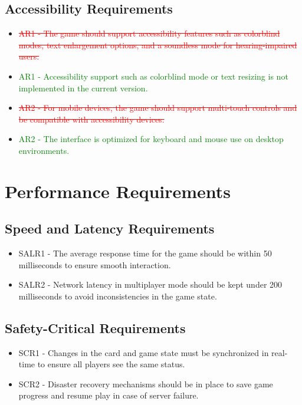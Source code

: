 \documentclass[12pt]{article}
\newcommand{\removed}[1]{\textcolor{red}{\sout{#1}}}
\newcommand{\added}[1]{\textcolor{green}{#1}}
\begin{document}
\subsection{Accessibility Requirements}
\begin{itemize}
    \item \removed{AR1 - The game should support accessibility features such as colorblind modes, text enlargement options, and a soundless mode for hearing-impaired users.}
    \item \added{AR1 - Accessibility support such as colorblind mode or text resizing is not implemented in the current version.}
    \item \removed{AR2 - For mobile devices, the game should support multi-touch controls and be compatible with accessibility devices.}
    \item \added{AR2 - The interface is optimized for keyboard and mouse use on desktop environments.}
\end{itemize}

\section{Performance Requirements}

\subsection{Speed and Latency Requirements}
\begin{itemize}
    \item SALR1 - The average response time for the game should be within 50 milliseconds to ensure smooth interaction.
    \item SALR2 - Network latency in multiplayer mode should be kept under 200 milliseconds to avoid inconsistencies in the game state.
\end{itemize}

\subsection{Safety-Critical Requirements}
\begin{itemize}
    \item SCR1 - Changes in the card and game state must be synchronized in real-time to ensure all players see the same status.
    \item SCR2 - Disaster recovery mechanisms should be in place to save game progress and resume play in case of server failure.
\end{itemize}
\end{document}
